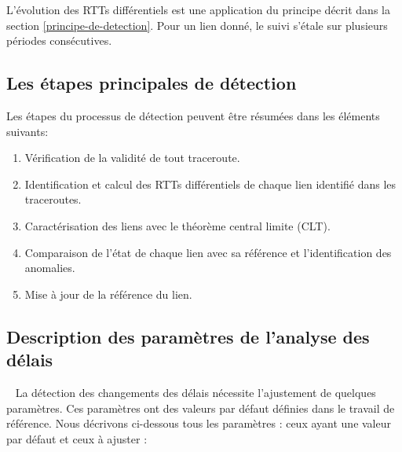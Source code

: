 L'évolution des RTTs différentiels est une  application du principe décrit dans la section  \ref{principe-de-detection}. Pour un lien donné, le suivi s'étale sur plusieurs  périodes consécutives.  

\subsection{Les étapes principales de détection} \label{steps:detection}
Les étapes du processus de détection peuvent être résumées dans les éléments suivants:

\begin{enumerate}[label=(\roman*)]
	
	\item Vérification de la validité de tout traceroute.
	
	\item Identification et calcul des RTTs différentiels de chaque lien identifié dans les traceroutes.
	
	\item Caractérisation des liens avec le théorème central limite (CLT).
	
	\item  Comparaison de l'état de chaque lien avec sa référence  et l'identification des anomalies.
	
	\item Mise à jour de la référence du lien.
\end{enumerate}

\subsection{Description des paramètres de l'analyse des délais} \label{par:parametre-de-lanalyse}~
La détection des changements des délais nécessite l'ajustement de quelques paramètres. Ces paramètres ont des valeurs par défaut  définies dans le travail de référence. Nous décrivons ci-dessous tous les paramètres : ceux ayant une valeur par défaut et ceux à ajuster :


